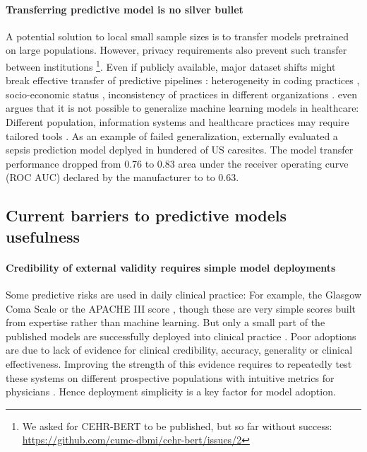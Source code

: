 \documentclass[french,12pt,twoside,a4paper]{book}
\newlength{\drop}%
\begin{document}
\paragraph{Transferring predictive model is no silver bullet} A potential
solution to local small sample sizes is to transfer models pretrained on large
populations. However, privacy requirements also prevent such transfer
between institutions \footnote{We asked for CEHR-BERT to be published, but so
  far without success: \url{https://github.com/cumc-dbmi/cehr-bert/issues/2}}.
Even if publicly available, major dataset shifts might break effective transfer
of predictive pipelines \citep{finlayson2021clinician}: heterogeneity in coding
practices \citep{juven2013codage}, socio-economic status
\citep{gianfrancesco2018potential}, inconsistency of practices in different
organizations \citep{agniel2018biases}.
\cite{futoma2020myth} even argues that it is not possible to generalize machine
learning models in healthcare: Different population, information systems and
healthcare practices may require tailored tools \citep{rose2018}. As an example
of failed generalization, \cite{wong2021external} externally evaluated a sepsis
prediction model deplyed in hundered of US caresites. The model transfer
performance dropped from 0.76 to 0.83 area under the receiver operating curve
(ROC AUC) declared by the manufacturer to to 0.63.

\subsection{Current barriers to predictive models usefulness}%
\label{subsec:predictive_models:useful}%

\paragraph{Credibility of external validity requires simple model deployments}

Some predictive risks are used in daily clinical practice: For example, the
Glasgow Coma Scale \citep{teasdale1974assessment} or the APACHE III score
\citep{knaus1991apache}, though these are very simple scores built from
expertise rather than machine learning. But only a small part of the published
models are successfully deployed into clinical practice
\citep{wyatt1995commentary, kelly2019key}. Poor adoptions are due to lack of
evidence for clinical credibility, accuracy, generality or clinical
effectiveness. Improving the strength of this evidence requires to repeatedly
test these systems on different prospective populations with intuitive metrics
for physicians \citep{kelly2019key, varoquaux2022evaluating, wornow2023shaky}.
Hence deployment simplicity is a key factor for model adoption.
\end{document}
